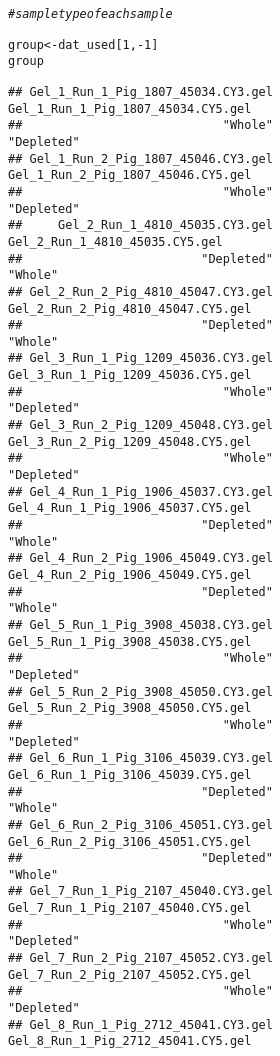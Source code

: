 \documentclass{article}\usepackage[]{graphicx}\usepackage[]{color}
\makeatletter
\newcommand{\hlnum}[1]{\textcolor[rgb]{0.686,0.059,0.569}{#1}}%
\newcommand{\hlcom}[1]{\textcolor[rgb]{0.678,0.584,0.686}{\textit{#1}}}%
\newcommand{\hlopt}[1]{\textcolor[rgb]{0,0,0}{#1}}%
\newcommand{\hlstd}[1]{\textcolor[rgb]{0.345,0.345,0.345}{#1}}%
\newcommand{\hlkwb}[1]{\textcolor[rgb]{0.69,0.353,0.396}{#1}}%
\newenvironment{kframe}{%
 \def\at@end@of@kframe{}%
 \ifinner\ifhmode%
  \def\at@end@of@kframe{\end{minipage}}%
  \begin{minipage}{\columnwidth}%
 \fi\fi%
 \def\FrameCommand##1{\hskip\@totalleftmargin \hskip-\fboxsep
 \colorbox{shadecolor}{##1}\hskip-\fboxsep
     \hskip-\linewidth \hskip-\@totalleftmargin \hskip\columnwidth}%
 \MakeFramed {\advance\hsize-\width
   \@totalleftmargin\z@ \linewidth\hsize
   \@setminipage}}%
 {\par\unskip\endMakeFramed%
 \at@end@of@kframe}
\newenvironment{knitrout}{}{} %
\makeatother
\begin{document}
\begin{knitrout}
\color{fgcolor}\begin{kframe}
\begin{alltt}
\hlcom{# sample type of each sample}

\hlstd{group} \hlkwb{<-} \hlstd{dat_used[}\hlnum{1}\hlstd{,}\hlopt{-}\hlnum{1}\hlstd{]}
\hlstd{group}
\end{alltt}
\begin{verbatim}
## Gel_1_Run_1_Pig_1807_45034.CY3.gel Gel_1_Run_1_Pig_1807_45034.CY5.gel 
##                            "Whole"                         "Depleted" 
## Gel_1_Run_2_Pig_1807_45046.CY3.gel Gel_1_Run_2_Pig_1807_45046.CY5.gel 
##                            "Whole"                         "Depleted" 
##     Gel_2_Run_1_4810_45035.CY3.gel     Gel_2_Run_1_4810_45035.CY5.gel 
##                         "Depleted"                            "Whole" 
## Gel_2_Run_2_Pig_4810_45047.CY3.gel Gel_2_Run_2_Pig_4810_45047.CY5.gel 
##                         "Depleted"                            "Whole" 
## Gel_3_Run_1_Pig_1209_45036.CY3.gel Gel_3_Run_1_Pig_1209_45036.CY5.gel 
##                            "Whole"                         "Depleted" 
## Gel_3_Run_2_Pig_1209_45048.CY3.gel Gel_3_Run_2_Pig_1209_45048.CY5.gel 
##                            "Whole"                         "Depleted" 
## Gel_4_Run_1_Pig_1906_45037.CY3.gel Gel_4_Run_1_Pig_1906_45037.CY5.gel 
##                         "Depleted"                            "Whole" 
## Gel_4_Run_2_Pig_1906_45049.CY3.gel Gel_4_Run_2_Pig_1906_45049.CY5.gel 
##                         "Depleted"                            "Whole" 
## Gel_5_Run_1_Pig_3908_45038.CY3.gel Gel_5_Run_1_Pig_3908_45038.CY5.gel 
##                            "Whole"                         "Depleted" 
## Gel_5_Run_2_Pig_3908_45050.CY3.gel Gel_5_Run_2_Pig_3908_45050.CY5.gel 
##                            "Whole"                         "Depleted" 
## Gel_6_Run_1_Pig_3106_45039.CY3.gel Gel_6_Run_1_Pig_3106_45039.CY5.gel 
##                         "Depleted"                            "Whole" 
## Gel_6_Run_2_Pig_3106_45051.CY3.gel Gel_6_Run_2_Pig_3106_45051.CY5.gel 
##                         "Depleted"                            "Whole" 
## Gel_7_Run_1_Pig_2107_45040.CY3.gel Gel_7_Run_1_Pig_2107_45040.CY5.gel 
##                            "Whole"                         "Depleted" 
## Gel_7_Run_2_Pig_2107_45052.CY3.gel Gel_7_Run_2_Pig_2107_45052.CY5.gel 
##                            "Whole"                         "Depleted" 
## Gel_8_Run_1_Pig_2712_45041.CY3.gel Gel_8_Run_1_Pig_2712_45041.CY5.gel 

\end{verbatim}
\end{kframe}
\end{knitrout}
\end{document}

